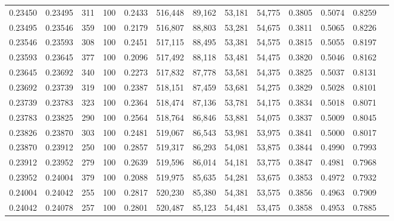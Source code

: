 \begin{tabular}{rrrrrrrrrrrrr}
0.23450 & 0.23495 &   311 & 100 &                                     0.2433 & 516,448 &  89,162 &  53,181 &  54,775 & 0.3805 & 0.5074 & 0.8259 \\
0.23495 & 0.23546 &   359 & 100 &                                     0.2179 & 516,807 &  88,803 &  53,281 &  54,675 & 0.3811 & 0.5065 & 0.8226 \\
0.23546 & 0.23593 &   308 & 100 &                                     0.2451 & 517,115 &  88,495 &  53,381 &  54,575 & 0.3815 & 0.5055 & 0.8197 \\
0.23593 & 0.23645 &   377 & 100 &                                     0.2096 & 517,492 &  88,118 &  53,481 &  54,475 & 0.3820 & 0.5046 & 0.8162 \\
0.23645 & 0.23692 &   340 & 100 &                                     0.2273 & 517,832 &  87,778 &  53,581 &  54,375 & 0.3825 & 0.5037 & 0.8131 \\
0.23692 & 0.23739 &   319 & 100 &                                     0.2387 & 518,151 &  87,459 &  53,681 &  54,275 & 0.3829 & 0.5028 & 0.8101 \\
0.23739 & 0.23783 &   323 & 100 &                                     0.2364 & 518,474 &  87,136 &  53,781 &  54,175 & 0.3834 & 0.5018 & 0.8071 \\
0.23783 & 0.23825 &   290 & 100 &                                     0.2564 & 518,764 &  86,846 &  53,881 &  54,075 & 0.3837 & 0.5009 & 0.8045 \\
0.23826 & 0.23870 &   303 & 100 &                                     0.2481 & 519,067 &  86,543 &  53,981 &  53,975 & 0.3841 & 0.5000 & 0.8017 \\
0.23870 & 0.23912 &   250 & 100 &                                     0.2857 & 519,317 &  86,293 &  54,081 &  53,875 & 0.3844 & 0.4990 & 0.7993 \\
0.23912 & 0.23952 &   279 & 100 &                                     0.2639 & 519,596 &  86,014 &  54,181 &  53,775 & 0.3847 & 0.4981 & 0.7968 \\
0.23952 & 0.24004 &   379 & 100 &                                     0.2088 & 519,975 &  85,635 &  54,281 &  53,675 & 0.3853 & 0.4972 & 0.7932 \\
0.24004 & 0.24042 &   255 & 100 &                                     0.2817 & 520,230 &  85,380 &  54,381 &  53,575 & 0.3856 & 0.4963 & 0.7909 \\
0.24042 & 0.24078 &   257 & 100 &                                     0.2801 & 520,487 &  85,123 &  54,481 &  53,475 & 0.3858 & 0.4953 & 0.7885 \\

\end{tabular}
